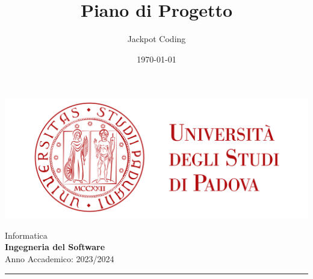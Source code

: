 \documentclass[5pt]{article}
\title{Piano di Progetto}
\author{Jackpot Coding}
\date{\today}
\begin{document}


    \vspace{8pt}
    \includegraphics[scale=0.2]{UNIPDFull.png}

\vspace{30pt}

\begin{minipage}[t]{0.48\textwidth}
        \begin{flushleft}
            Informatica\\
            \vspace{5pt}
            \textbf{\LARGE Ingegneria del Software}\\
            Anno Accademico: 2023/2024
        \end{flushleft}
\end{minipage}


\vspace{5px}


\rule{\textwidth}{5pt}
\end{document}

